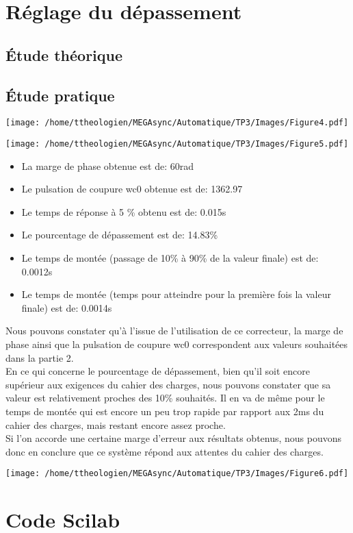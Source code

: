 \documentclass[a4paper,12pt]{article}
\begin{document}
	\section{Réglage du dépassement}
		\subsection{Étude théorique}
			\newpage
		\subsection{Étude pratique}
			\begin{center}
				\texttt{[image: /home/ttheologien/MEGAsync/Automatique/TP3/Images/Figure4.pdf]}
			\end{center}
			\begin{center}
				\texttt{[image: /home/ttheologien/MEGAsync/Automatique/TP3/Images/Figure5.pdf]}
			\end{center}
			\begin{itemize}
				\item La marge de phase obtenue est de: 60rad
				\item Le pulsation de coupure wc0 obtenue est de: 1362.97
				\item Le temps de réponse à 5 \% obtenu est de: 0.015s
				\item Le pourcentage de dépassement est de: 14.83\%
				\item Le temps de montée (passage de 10\% à 90\% de la valeur finale) est de: 0.0012s
				\item Le temps de montée (temps pour atteindre pour la première fois la valeur finale) est de: 0.0014s
			\end{itemize}
			Nous pouvons constater qu'à l'issue de l'utilisation de ce correcteur, la marge de phase ainsi que la pulsation de coupure wc0 correspondent aux valeurs souhaitées dans la partie 2. \\
			En ce qui concerne le pourcentage de dépassement, bien qu'il soit encore supérieur aux exigences du cahier des charges, nous pouvons constater que sa valeur est relativement proches des 10\% souhaités. Il en va de même pour le temps de montée qui est encore un peu trop rapide par rapport aux 2ms du cahier des charges, mais restant encore assez proche. \\
			Si l'on accorde une certaine marge d'erreur aux résultats obtenus, nous pouvons donc en conclure que ce système répond aux attentes du cahier des charges.
			\begin{center}
				\texttt{[image: /home/ttheologien/MEGAsync/Automatique/TP3/Images/Figure6.pdf]}
			\end{center}
			
			
	\section{Code Scilab}
		\begin{center}
			
			
			
		\end{center}
\end{document}
